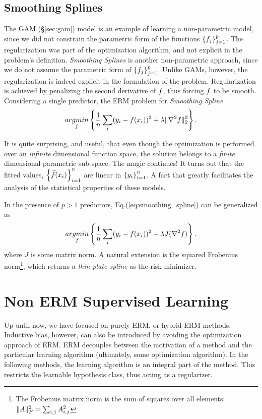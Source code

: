 \subsection{Smoothing Splines}
\label{sec:smoothing_splines}
The GAM (\S\ref{sec:gam}) model is an example of learning a non-parametric model, since we did not constrain the parametric form of the functions $\left\{ f_j \right\}_{j=1}^p$. The regularization was part of the optimization algorithm, and not explicit in the problem's definition.
\emph{Smoothing Splines} is another non-parametric approach, since we do not assume the parametric form of $\left\{ f_j \right\}_{j=1}^p$. 
Unlike GAMs, however, the regularization is indeed explicit in the formulation of the problem. 
Regularization is achieved by penalizing the second derivative of $f$, thus forcing $f$ to be smooth. 
Considering a single predictor, the ERM problem for \emph{Smoothing Spline}
\begin{align}
\label{eq:smoothing_spline}
	 \mathop{argmin} _{f}\left\{ \frac{1}{n}\sum_i (y_i-f(x_i))^2 + \lambda \Vert \nabla^2 f \Vert_2^2   \right\}.
\end{align}

It is quite surprising, and useful, that even though the optimization is performed over an \emph{infinite} dimensional function space, the solution belongs to a \emph{finite } dimensional parametric sub-space. 
The magic continues! It turns out that the fitted values, $\left\{ \widehat{f}(x_i) \right\}_{i=1}^n$ are linear in $\left\{ y_i \right\}_{i=1}^n$. A fact that greatly facilitates the analysis of the statistical properties of these models.

In the presence of $p>1$ predictors, Eq.(\ref{eq:smoothing_spline}) can be generalized as 
\begin{align}
\label{eq:smoothing_spline_multi}
	 \mathop{argmin} _{f}\left\{ \frac{1}{n}\sum_i (y_i-f(x_i))^2 + \lambda J(\nabla^2 f)   \right\}.
\end{align}
where $J$ is some matrix norm. A natural extension is the squared Frobenius norm\footnote{The Frobenius matrix norm is the sum of squares over all elements: $\Vert A \Vert^2_F=\sum_{i,j} A_{i,j}^2$ }, which returns a \emph{thin plate spline} as the risk minimizer.




\section{Non ERM Supervised Learning}
\label{sec:non_erm}
Up until now, we have focused on purely ERM, or hybrid ERM methods.
Inductive bias, however, can also be introduced by avoiding the optimization approach of ERM.
ERM decouples between the motivation of a method and the particular learning algorithm (ultimately, some optimization algorithm).
In the following methods, the learning algorithm is an integral part of the method. 
This restricts the learnable hypothesis class, thus acting as a regularizer.

